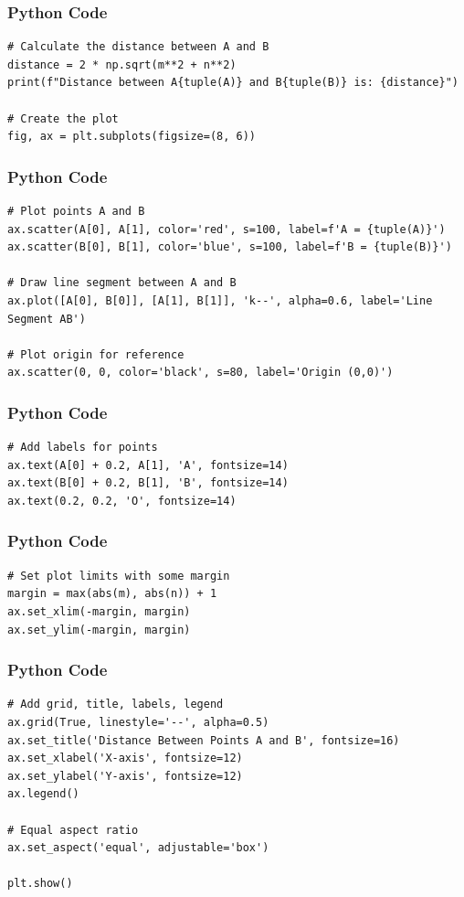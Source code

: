 \documentclass{beamer}
\begin{document}
\begin{frame}[fragile]
    \frametitle{Python Code}

    \begin{lstlisting}
# Calculate the distance between A and B
distance = 2 * np.sqrt(m**2 + n**2)
print(f"Distance between A{tuple(A)} and B{tuple(B)} is: {distance}")

# Create the plot
fig, ax = plt.subplots(figsize=(8, 6))

    \end{lstlisting}
\end{frame}

\begin{frame}[fragile]
    \frametitle{Python Code}

    \begin{lstlisting}
# Plot points A and B
ax.scatter(A[0], A[1], color='red', s=100, label=f'A = {tuple(A)}')
ax.scatter(B[0], B[1], color='blue', s=100, label=f'B = {tuple(B)}')

# Draw line segment between A and B
ax.plot([A[0], B[0]], [A[1], B[1]], 'k--', alpha=0.6, label='Line Segment AB')

# Plot origin for reference
ax.scatter(0, 0, color='black', s=80, label='Origin (0,0)')
    \end{lstlisting}
\end{frame}

\begin{frame}[fragile]
    \frametitle{Python Code}

    \begin{lstlisting}
# Add labels for points
ax.text(A[0] + 0.2, A[1], 'A', fontsize=14)
ax.text(B[0] + 0.2, B[1], 'B', fontsize=14)
ax.text(0.2, 0.2, 'O', fontsize=14)
\end{lstlisting}
\end{frame}

 
\begin{frame}[fragile]
    \frametitle{Python Code}

    \begin{lstlisting}
# Set plot limits with some margin
margin = max(abs(m), abs(n)) + 1
ax.set_xlim(-margin, margin)
ax.set_ylim(-margin, margin)
\end{lstlisting}
\end{frame}
\begin{frame}[fragile]
    \frametitle{Python Code}

    \begin{lstlisting}
# Add grid, title, labels, legend
ax.grid(True, linestyle='--', alpha=0.5)
ax.set_title('Distance Between Points A and B', fontsize=16)
ax.set_xlabel('X-axis', fontsize=12)
ax.set_ylabel('Y-axis', fontsize=12)
ax.legend()

# Equal aspect ratio
ax.set_aspect('equal', adjustable='box')

plt.show()
\end{lstlisting}
\end{frame}
\end{document}
